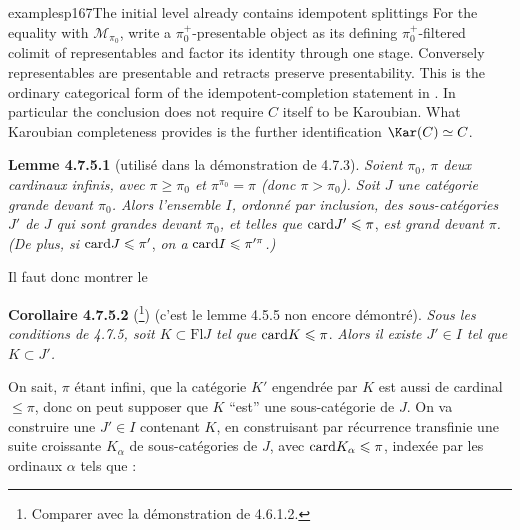 \begin{dcomment}{examples}{p167}{The initial level already contains idempotent splittings}
For the equality with $\mathcal M_{\pi_0}$, write a $\pi_0^+$-presentable object as its defining $\pi_0^+$-filtered colimit of representables and factor its identity through one stage. Conversely representables are presentable and retracts preserve presentability. This is the ordinary categorical form of the idempotent-completion statement in \citet[Lemma 5.4.2.4]{Lurie2009HTT}. In particular the conclusion does not require $C$ itself to be Karoubian. What Karoubian completeness provides is the further identification $\Kar(C)\simeq C$.
\end{dcomment}


\textbf{Lemme 4.7.5.1} (utilisé dans la démonstration de 4.7.3). \textit{Soient $\pi_0$, $\pi$ deux cardinaux infinis, avec $\pi \geqslant \pi_0$ et $\pi^{\pi_0} = \pi$ (donc $\pi > \pi_0$). Soit $J$ une catégorie grande devant $\pi_0$. Alors l’ensemble $I$, ordonné par inclusion, des sous-catégories $J'$ de $J$ qui sont grandes devant $\pi_0$, et telles que} $\mathrm{card} J' \leqslant \pi$, \textit{est grand devant $\pi$. (De plus, si} $\mathrm{card} J \leqslant \pi'$, \textit{on a} $\mathrm{card} I \leqslant \pi'^{\pi}$\textit{.)}

Il faut donc montrer le

\textbf{Corollaire 4.7.5.2} (\footnote[70]{Comparer avec la démonstration de 4.6.1.2.}) (c’est le lemme 4.5.5 non encore démontré). \textit{Sous les conditions de 4.7.5, soit $K \subset \mathrm{Fl} J$ tel que} $\mathrm{card} K \leqslant \pi$. \textit{Alors il existe $J' \in I$ tel que $K \subset J'$.}

On sait, $\pi$ étant infini, que la catégorie $K'$ engendrée par $K$ est aussi de cardinal $\leqslant \pi$, donc on peut supposer que $K$ “est” une sous-catégorie de $J$. On va construire une $J' \in I$ contenant $K$, en construisant par récurrence transfinie une suite croissante $K_{\alpha}$ de sous-catégories de $J$, avec $\mathrm{card} K_{\alpha} \leqslant \pi$, indexée par les ordinaux $\alpha$ tels que \fbox{$\card \alpha \leqslant \pi$} :

